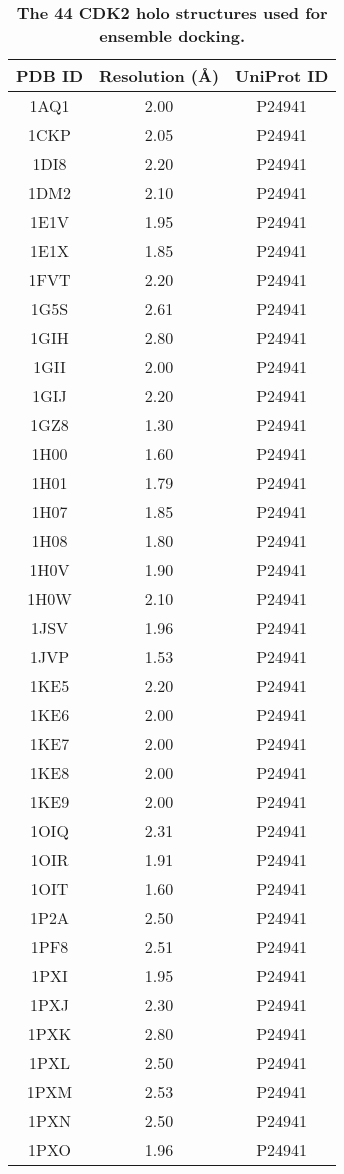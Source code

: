 \documentclass[10pt]{article}
\begin{document}
\begin{table}
\caption{
\bf{The 44 CDK2 holo structures used for ensemble docking.}}
\begin{tabular}{ccc}
\hline
PDB ID & Resolution (\AA) & UniProt ID\\
\hline
1AQ1 & 2.00 & P24941\\
1CKP & 2.05 & P24941\\
1DI8 & 2.20 & P24941\\
1DM2 & 2.10 & P24941\\
1E1V & 1.95 & P24941\\
1E1X & 1.85 & P24941\\
1FVT & 2.20 & P24941\\
1G5S & 2.61 & P24941\\
1GIH & 2.80 & P24941\\
1GII & 2.00 & P24941\\
1GIJ & 2.20 & P24941\\
1GZ8 & 1.30 & P24941\\
1H00 & 1.60 & P24941\\
1H01 & 1.79 & P24941\\
1H07 & 1.85 & P24941\\
1H08 & 1.80 & P24941\\
1H0V & 1.90 & P24941\\
1H0W & 2.10 & P24941\\
1JSV & 1.96 & P24941\\
1JVP & 1.53 & P24941\\
1KE5 & 2.20 & P24941\\
1KE6 & 2.00 & P24941\\
1KE7 & 2.00 & P24941\\
1KE8 & 2.00 & P24941\\
1KE9 & 2.00 & P24941\\
1OIQ & 2.31 & P24941\\
1OIR & 1.91 & P24941\\
1OIT & 1.60 & P24941\\
1P2A & 2.50 & P24941\\
1PF8 & 2.51 & P24941\\
1PXI & 1.95 & P24941\\
1PXJ & 2.30 & P24941\\
1PXK & 2.80 & P24941\\
1PXL & 2.50 & P24941\\
1PXM & 2.53 & P24941\\
1PXN & 2.50 & P24941\\
1PXO & 1.96 & P24941\\

\end{tabular}
\end{table}
\end{document}
